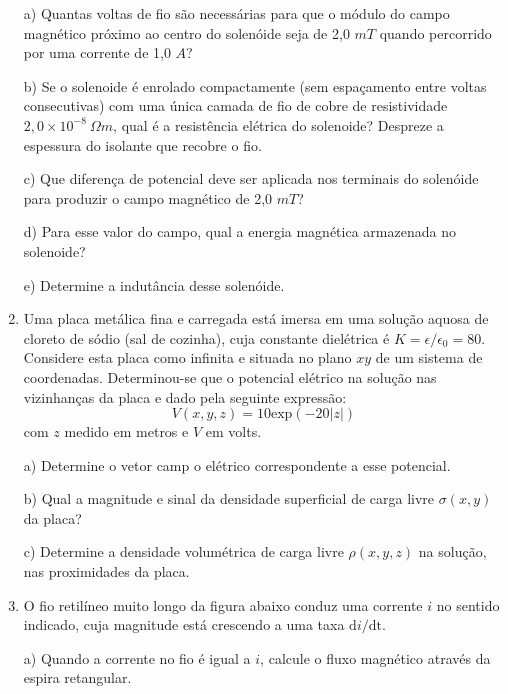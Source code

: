 \begin{enumerate}[start=1,label={\bfseries Q\arabic*.}]
a) Quantas voltas de fio são necessárias para que o módulo do campo magnético próximo ao centro do solenóide seja de 2,0 $mT$ quando percorrido por uma corrente de 1,0 $A$?

\resposta

b) Se o solenoide é enrolado compactamente (sem espaçamento entre voltas consecutivas) com uma única camada de fio de cobre de resistividade $2,0 \times 10^{-8} \ \Omega m$, qual é a resistência elétrica do solenoide? Despreze a espessura do isolante que recobre o fio.

\resposta

c) Que diferença de potencial deve ser aplicada nos terminais do solenóide para produzir o campo magnético de 2,0 $mT$?

\resposta

d) Para esse valor do campo, qual a energia magnética armazenada no solenoide?

\resposta

e) Determine a indutância desse solenóide.

\resposta



\item Uma placa metálica ﬁna e carregada está imersa em uma solução aquosa de cloreto de sódio (sal de cozinha), cuja constante dielétrica é $K = \epsilon / \epsilon_{0} = 80$. Considere esta placa como inﬁnita e situada no plano $xy$ de um sistema de coordenadas. Determinou-se que o potencial elétrico na solução nas vizinhanças da placa e dado pela seguinte expressão:
$$
V(x,y,z) = 10 \mathrm{exp}(-20|z|)
$$
com $z$ medido em metros e $V$ em volts.

a) Determine o vetor camp o elétrico correspondente a esse potencial.

\resposta

b) Qual a magnitude e sinal da densidade superﬁcial de carga livre $\sigma(x,y)$ da placa?

\resposta

c) Determine a densidade volumétrica de carga livre $\rho(x,y,z)$ na solução, nas proximidades da placa.

\resposta


\item  O ﬁo retilíneo muito longo da ﬁgura abaixo conduz uma corrente $i$ no sentido indicado, cuja magnitude está crescendo a uma taxa $\mathrm{d} i/\mathrm{dt}$.

a) Quando a corrente no ﬁo é igual a $i$, calcule o ﬂuxo magnético através da espira retangular.


\end{enumerate}
